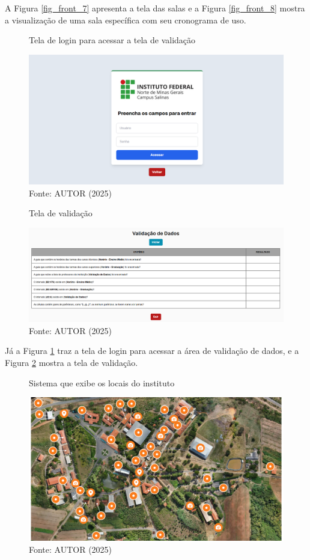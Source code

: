 A Figura \ref{fig_front_7} apresenta a tela das salas e a Figura \ref{fig_front_8} mostra a visualização de uma sala específica com seu cronograma de uso.

\begin{figure}[htb]
    \centering
    \caption{Tela de login para acessar a tela de validação}
    \includegraphics[width=1\textwidth]{Figuras/front-9.png}
    \caption*{Fonte: AUTOR (2025)}
    \label{fig_front_9}
\end{figure}

\begin{figure}[H]
    \centering
    \caption{Tela de validação}
    \includegraphics[width=1\textwidth]{Figuras/front-10.png}
    \caption*{Fonte: AUTOR (2025)}
    \label{fig_front_10}
\end{figure}

Já a Figura \ref{fig_front_9} traz a tela de login para acessar a área de validação de dados, e a Figura \ref{fig_front_10} mostra a tela de validação.

\begin{figure}[htb]
    \centering
    \caption{Sistema que exibe os locais do instituto}
    \includegraphics[width=1\textwidth]{Figuras/front-11.png}
    \caption*{Fonte: AUTOR (2025)}
    \label{fig_front_11}
\end{figure}

